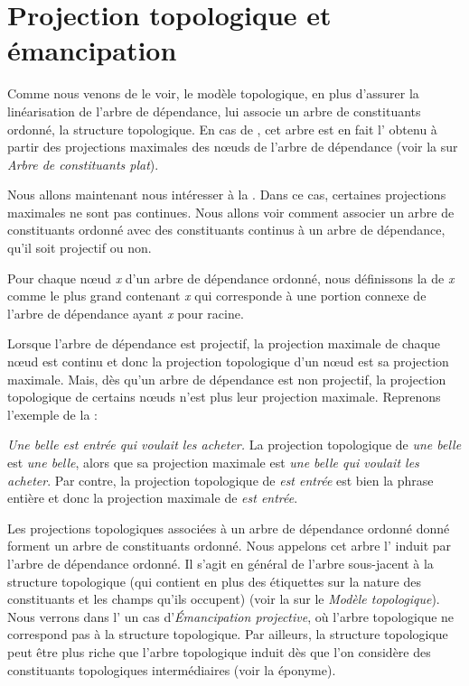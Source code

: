 \section{Projection topologique et émancipation}\label{sec:3.5.30}

Comme nous venons de le voir, le modèle topologique, en plus d’assurer la linéarisation de l’arbre de dépendance, lui associe un arbre de constituants ordonné, la structure topologique. En cas de , cet arbre est en fait l’ obtenu à partir des projections maximales des nœuds de l’arbre de dépendance (voir la  sur \textit{Arbre de constituants plat}).

Nous allons maintenant nous intéresser à la . Dans ce cas, certaines projections maximales ne sont pas continues. Nous allons voir comment associer un arbre de constituants ordonné avec des constituants continus à un arbre de dépendance, qu’il soit projectif ou non.

{Pour chaque nœud \textit{x} d’un arbre de dépendance ordonné, nous définissons la  de \textit{x} comme le plus grand  contenant \textit{x} qui corresponde à une portion connexe de l’arbre de dépendance ayant \textit{x} pour racine.}

Lorsque l’arbre de dépendance est projectif, la projection maximale de chaque nœud est continu et donc la projection topologique d’un nœud est sa projection maximale. Mais, dès qu’un arbre de dépendance est non projectif, la projection topologique de certains nœuds n’est plus leur projection maximale. Reprenons l’exemple  de la  :

\ea\label{ex:belle}
    \textit{{Une belle est entrée qui voulait les acheter}.}
\z
La projection topologique de \textit{une belle} est \textit{une belle}, alors que sa projection maximale est \textit{une belle qui voulait les acheter}. Par contre, la projection topologique de \textit{est entrée} est bien la phrase entière et donc la projection maximale de \textit{est entrée}.

Les projections topologiques associées à un arbre de dépendance ordonné don\-né forment un arbre de constituants ordonné. Nous appelons cet arbre l’ induit par l’arbre de dépendance ordonné. Il s'agit en général de l'arbre sous-jacent à la structure topologique (qui contient en plus des étiquettes sur la nature des constituants et les champs qu'ils occupent) (voir la  sur le {\textit{Modèle topologique}}). Nous verrons dans l' un cas d'\textit{Émancipation projective}, où l'arbre topologique ne correspond pas à la structure topologique. Par ailleurs, la structure topologique peut être plus riche que l'arbre topologique induit dès que l'on considère des constituants topologiques intermédiaires (voir la  éponyme).

